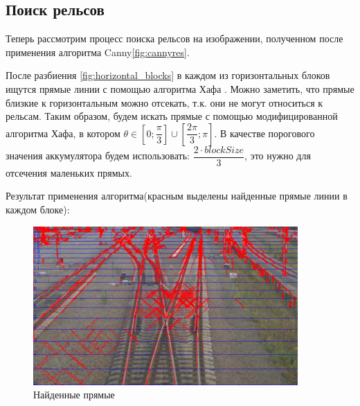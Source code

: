 \subsection{Поиск рельсов}\label{rails_find}
Теперь рассмотрим процесс поиска рельсов на изображении, полученном после применения алгоритма Canny\ref{fig:cannyres}.

После разбиения \ref{fig:horizontal_blocks} в каждом из горизонтальных блоков ищутся прямые линии с помощью алгоритма Хафа \cite{b:hough_transform}. Можно заметить, что прямые близкие к горизонтальным можно отсекать, т.к. они не могут относиться к рельсам. Таким образом, будем искать прямые с помощью модифицированной алгоритма Хафа, в котором $\theta \in [0;\dfrac{\pi}{3}] \cup [\dfrac{2\pi}{3};\pi]$. В качестве порогового значения аккумулятора будем использовать: $\dfrac{2\cdot blockSize}{3}$, это нужно для отсечения маленьких прямых.

Результат применения алгоритма(красным выделены найденные прямые линии в каждом блоке):
\begin{figure}[!h]
	\centering
	\includegraphics[width=0.9\textwidth]{pictures/hough_lines_res}
	\caption[Результат применения алгоритма]{Найденные прямые}
	\label{fig:houghlinesres}
\end{figure}

